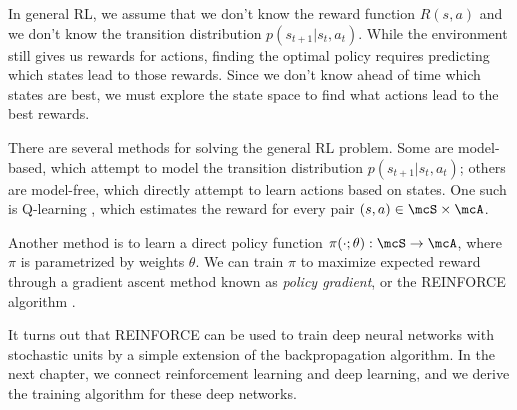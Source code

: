 \documentclass[12pt]{report}
\begin{document}
In general RL, we assume that we don't know the reward function $R(s,a)$ and we don't know the transition distribution $p(s_{t+1} | s_t, a_t)$. While the environment still gives us rewards for actions, finding the optimal policy requires predicting which states lead to those rewards.
Since we don't know ahead of time which states are best, we must explore the state space to find what actions lead to the best rewards.

There are several methods for solving the general RL problem. Some are model-based, which attempt to model the transition distribution $p(s_{t+1} | s_t, a_t)$; others are model-free, which directly attempt to learn actions based on states. One such is Q-learning \citep{Watkins1989}, which estimates the reward for every pair $(s,a) \in \mcS \times \mcA$.

Another method is to learn a direct policy function $\pi( \cdot ; \theta) : \mcS \to \mcA$, where $\pi$ is parametrized by weights $\theta$. We can train $\pi$  to maximize expected reward through a gradient ascent method known as \emph{policy gradient}, or the REINFORCE algorithm \citep{williams1992reinforce}.

It turns out that REINFORCE can be used to train deep neural networks with stochastic units by a simple extension of the backpropagation algorithm. In the next chapter, we connect reinforcement learning and deep learning, and we derive the training algorithm for these deep networks.

%
%
\end{document}
